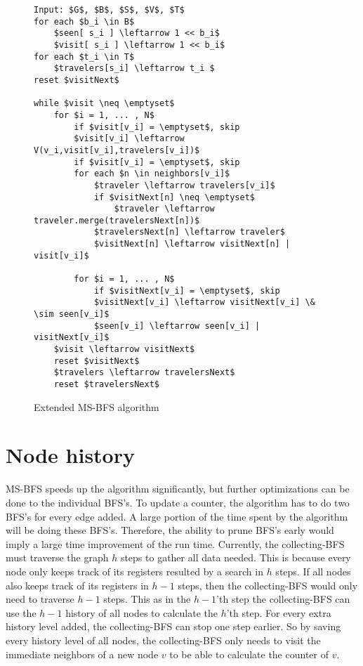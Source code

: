 \begin{figure}[h]
    \begin{lstlisting}[mathescape]
Input: $G$, $B$, $S$, $V$, $T$
for each $b_i \in B$
    $seen[ s_i ] \leftarrow 1 << b_i$
    $visit[ s_i ] \leftarrow 1 << b_i$
for each $t_i \in T$
    $travelers[s_i] \leftarrow t_i $
reset $visitNext$

while $visit \neq \emptyset$
    for $i = 1, ... , N$
        if $visit[v_i] = \emptyset$, skip
        $visit[v_i] \leftarrow V(v_i,visit[v_i],travelers[v_i])$
        if $visit[v_i] = \emptyset$, skip
        for each $n \in neighbors[v_i]$
            $traveler \leftarrow travelers[v_i]$
            if $visitNext[n] \neq \emptyset$
                $traveler \leftarrow traveler.merge(travelersNext[n])$
            $travelersNext[n] \leftarrow traveler$
            $visitNext[n] \leftarrow visitNext[n] | visit[v_i]$
            
        for $i = 1, ... , N$
            if $visitNext[v_i] = \emptyset$, skip
            $visitNext[v_i] \leftarrow visitNext[v_i] \& \sim seen[v_i]$
            $seen[v_i] \leftarrow seen[v_i] | visitNext[v_i]$
    $visit \leftarrow visitNext$
    reset $visitNext$
    $travelers \leftarrow travelersNext$
    reset $travelersNext$
    \end{lstlisting}
    \caption{Extended MS-BFS algorithm}
    \label{fig:extended_ms-bfs_algorithm}
\end{figure}


\section{Node history}

MS-BFS speeds up the algorithm significantly, but further optimizations can be done to the individual BFS's. To update a counter, the algorithm has to do two BFS's for every edge added. A large portion of the time spent by the algorithm will be doing these BFS's. Therefore, the ability to prune BFS's early would imply a large time improvement of the run time. Currently, the collecting-BFS must traverse the graph $h$ steps to gather all data needed. This is because every node only keeps track of its registers resulted by a search in $h$ steps. If all nodes also keeps track of its registers in $h-1$ steps, then the collecting-BFS would only need to traverse $h-1$ steps. This as in the $h-1$'th step the collecting-BFS can use the $h-1$ history of all nodes to calculate the $h$'th step. For every extra history level added, the collecting-BFS can stop one step earlier. So by saving every history level of all nodes, the collecting-BFS only needs to visit the immediate neighbors of a new node $v$ to be able to calculate the counter of $v$. 

